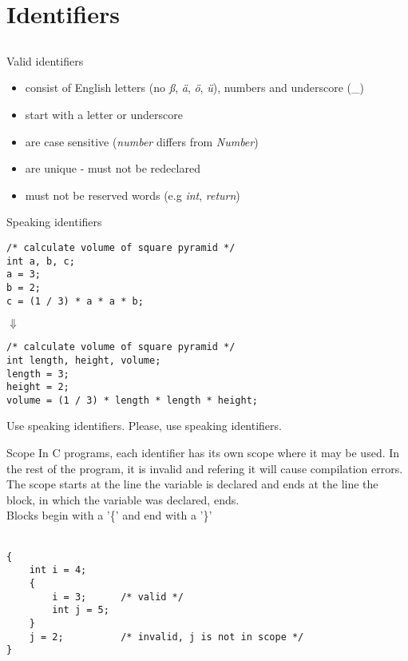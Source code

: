 \section{Identifiers}
\subsection{}
\begin{frame}{Valid identifiers}
	\begin{itemize}
		\item consist of English letters (no \textit{ß}, \textit{ä}, \textit{ö}, \textit{ü}), numbers and underscore (\_)
		\item start with a letter or underscore
		\item are case sensitive (\textit{number} differs from \textit{Number})
		\item are unique - must not be redeclared
		\item must not be reserved words (e.g \textit{int}, \textit{return})
	\end{itemize}
\end{frame}
\begin{frame}[fragile]{Speaking identifiers}
	\begin{lstlisting}
/* calculate volume of square pyramid */
int a, b, c;
a = 3;
b = 2;
c = (1 / 3) * a * a * b;
\end{lstlisting}
\centering
$\Downarrow$
	\begin{lstlisting}
/* calculate volume of square pyramid */
int length, height, volume;
length = 3;
height = 2;
volume = (1 / 3) * length * length * height;
\end{lstlisting}
\end{frame}
\begin{frame}{Use speaking identifiers.}
	\LARGE
	\centering
	Please, use speaking identifiers.\footnotemark
	
\end{frame}
\begin{frame}[fragile]{Scope}
	In C programs, each identifier has its own scope where it may be used. In the rest of the program, it is invalid and refering it will cause compilation errors. \\
	The scope starts at the line the variable is declared and ends at the line the block, in which the variable was declared, ends. \\
	Blocks begin with a '\{' and end with a '\}'\\\ \\
	\begin{lstlisting}[numbers=none]
{
	int i = 4;
	{
		i = 3;		/* valid */
		int j = 5;
	}
	j = 2;			/* invalid, j is not in scope */
}
\end{lstlisting}
\end{frame}

